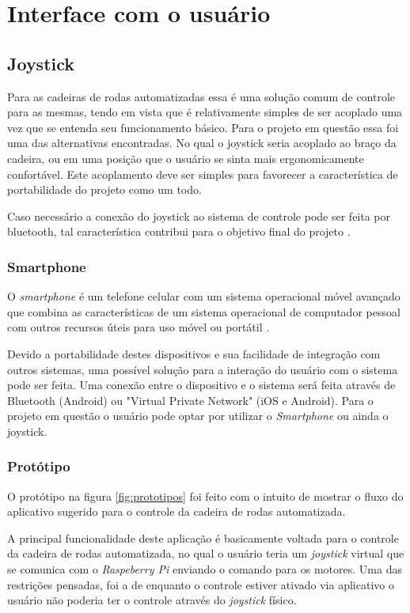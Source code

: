 \section{Interface com o usuário}


\subsection{Joystick}
Para as cadeiras de rodas automatizadas essa é uma solução comum de controle para as mesmas, tendo em vista que é relativamente simples de ser acoplado uma vez que se entenda seu funcionamento básico. Para o projeto em questão essa foi uma das alternativas encontradas. No qual o joystick seria acoplado ao braço da cadeira, ou em uma posição que o usuário se sinta mais ergonomicamente confortável. Este acoplamento deve ser simples para favorecer a característica de portabilidade do projeto como um todo.

Caso necessário a conexão do joystick ao sistema de controle pode ser feita por bluetooth, tal característica contribui para o objetivo final do projeto \cite{artigo_joystick_controller}.

\subsubsection{Smartphone}
O \textit{smartphone} é um telefone celular com um sistema operacional móvel avançado que combina as características de um sistema operacional de computador pessoal com outros recursos úteis para uso móvel ou portátil \cite{article_smartphone}.

Devido a portabilidade destes dispositivos e sua facilidade de integração com outros sistemas, uma possível solução para a interação do usuário com o sistema pode ser feita. Uma conexão entre o dispositivo e o sistema será feita através de Bluetooth (Android) ou "Virtual Private Network" (iOS e Android). Para o projeto em questão o usuário pode optar por utilizar o \textit{Smartphone} ou ainda o joystick.

\subsubsection{Protótipo}

O protótipo na figura \ref{fig:prototipos} foi feito com o intuito de mostrar o fluxo do aplicativo sugerido para o controle da cadeira de rodas automatizada.

A principal funcionalidade deste aplicação é basicamente voltada para o controle da cadeira de rodas automatizada, no qual o usuário teria um \textit{joystick} virtual que se comunica com o \textit{Raspeberry Pi} enviando o comando para os motores.
Uma das restrições pensadas, foi a de enquanto o controle estiver ativado via aplicativo o usuário não poderia ter o controle através do \textit{joystick} físico.


